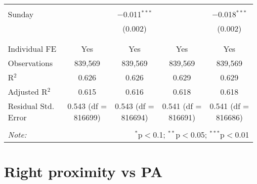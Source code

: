\documentclass[
]{article}
\begin{document}
\begin{table}[!htbp]
{\begin{tabular}{@{\extracolsep{5pt}}lcccc}
  & & & & \\ 
 Sunday &  & $-$0.011$^{***}$ &  & $-$0.018$^{***}$ \\ 
  &  & (0.002) &  & (0.002) \\ 
  & & & & \\ 
\hline \\[-1.8ex] 
Individual FE & Yes & Yes & Yes & Yes \\ 
Observations & 839,569 & 839,569 & 839,569 & 839,569 \\ 
R$^{2}$ & 0.626 & 0.626 & 0.629 & 0.629 \\ 
Adjusted R$^{2}$ & 0.615 & 0.616 & 0.618 & 0.618 \\ 
Residual Std. Error & 0.543 (df = 816699) & 0.543 (df = 816694) & 0.541 (df = 816691) & 0.541 (df = 816686) \\ 
\hline 
\hline \\[-1.8ex] 
\textit{Note:}  & \multicolumn{4}{r}{$^{*}$p$<$0.1; $^{**}$p$<$0.05; $^{***}$p$<$0.01} \\ 
\end{tabular}
} 
\end{table} 
\newpage
\section{Right proximity vs PA}
\end{document}
